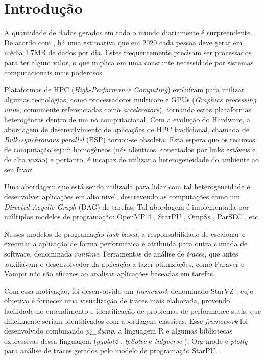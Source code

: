 \chapter{Introdução} \label{ch:intro}

A quantidade de dados gerados em todo o mundo diariamente é surpreendente. De acordo com \citet{ref:data_minute2}, há uma estimativa
que em 2020 cada pessoa deve gerar em média 1,7MB de dados por dia. Estes frequentemente precisam ser processados para ter algum valor,
o que implica em uma constante necessidade por sistemas computacionais mais poderosos.

Plataformas de HPC (\emph{High-Performance Computing}) evoluíram para
utilizar algumas tecnologias, como processadores multicore e GPUs
(\emph{Graphics processing units}, comumente referenciadas como
\emph{accelerators}), tornando estas plataformas heterogêneas dentro
de um nó computacional. Com a evolução do Hardware, a abordagem de
desenvolvimento de aplicações de HPC tradicional, chamada de
\emph{Bulk-synchronous parallel} (BSP) tornou-se obsoleta. Esta espera
que os recursos de computação sejam homogêneos (nós idênticos,
conectados por links estáveis e de alta vazão) e portanto, é incapaz
de utilizar a heterogeneidade do ambiente ao seu favor.

Uma abordagem que está sendo utilizada para lidar com tal heterogeneidade é desenvolver aplicações em alto nível, descrevendo as computações como um \emph{Directed Acyclic Graph} (DAG) de tarefas. Tal abordagem é implementada por múltiplos modelos de programação: OpenMP 4 \cite{ref:openmp4}, StarPU \cite{ref:starpu}, OmpSs \cite{ref:ompss}, ParSEC \cite{ref:parsec}, etc. 

Nesses modelos de programação \emph{task-based}, a responsabilidade de escalonar e executar a aplicação de forma performática é atribuída para outra camada de software, denominada \emph{runtime}. Ferramentas de análise de \emph{traces}, que antes auxiliavam o desenvolvedor da aplicação a fazer otimizações, como Paraver \cite{ref:paraver} e Vampir \cite{ref:vampir} não são eficazes ao analisar aplicações baseadas em tarefas.

Com essa motivação, foi desenvolvido um \emph{framework} denominado StarVZ \cite{ref:starvz}, cujo objetivo é fornecer uma visualização de traces mais elaborada, provendo facilidade no entendimento e identificação de problemas de performance sutis, que dificilmente seriam identificados com abordagens clássicas. Esse \emph{framework} foi desenvolvido combinando \emph{pj\_dump},  a linguagem R \cite{ref:rlanguage} e algumas bibliotecas expressivas dessa linguagem (\emph{ggplot2} \cite{ref:ggplot2}, \emph{lpSolve} \cite{ref:lpsolve} e \emph{tidyverse} \cite{ref:tidyverse}), Org-mode \cite{ref:org-mode} e \emph{plotly} para análise de traces gerados pelo modelo de programação StarPU. 

